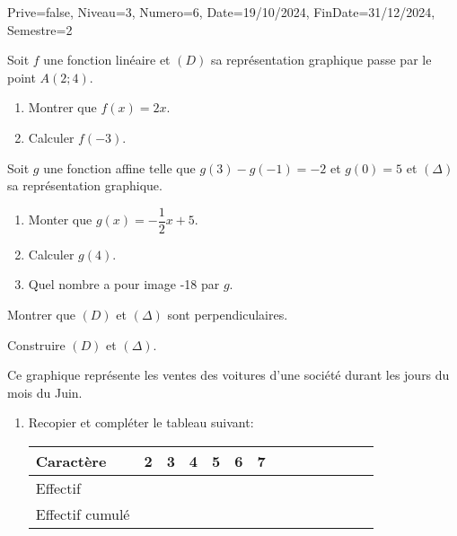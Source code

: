 \documentclass[a4paper,12pt]{article}
\begin{document}
\begin{Maquette}[DM]{Prive=false, Niveau=3, Numero=6, Date=19/10/2024, FinDate=31/12/2024, Semestre=2}

\begin{exercice}
\begin{enumerate}
\item Soit $f$ une fonction linéaire et $(D)$ sa représentation graphique passe par le point $A(2;4)$.
\begin{enumerate}
\item Montrer que $f(x)=2x$.
\item Calculer $f(-3)$.
\end{enumerate}
\item Soit $g$ une fonction affine telle que $g(3)-g(-1)=-2$ et $g(0)=5$ et $(\Delta)$ sa représentation graphique.

\begin{minipage}{0.5\linewidth}
\begin{enumerate}
\item Monter que $g(x)=-\dfrac{1}{2}x+5$.
\item Calculer $g(4)$.
\item Quel nombre a pour image -18 par $g$.
\end{enumerate}
\end{minipage}%
\begin{minipage}{0.5\linewidth}
\item Montrer que $(D)$ et $(\Delta)$ sont perpendiculaires.
\item Construire  $(D)$ et $(\Delta)$.
\end{minipage}
\end{enumerate}
\end{exercice}

\begin{exercice}
\begin{minipage}{.5\linewidth}
Ce graphique représente les ventes des voitures d'une société durant les jours du mois du Juin.
\begin{enumerate}
\item Recopier et compléter le tableau suivant:

\begin{tabular}{|*7{Oc|}}
\hline 
Caractère & 2 & 3 & 4 & 5 & 6 & 7 \\ 
\hline 
Effectif &  &  &  &  &  &  \\ 
\hline 
Effectif cumulé  &  &  &  &  &  &  \\ 
\hline 
\end{tabular}


\end{enumerate}
\end{minipage}
\end{exercice}
\end{Maquette}
\end{document}
